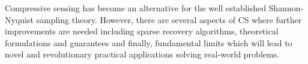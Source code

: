 \documentclass[journal]{IEEEtran}
\begin{document}
Compressive sensing has become an alternative for the well established Shannon-Nyquist sampling theory. However, there are several aspects of CS where further improvements are needed including sparse recovery algorithms, theoretical formulations and guarantees and finally, fundamental limits which will lead to novel and revolutionary practical applications solving real-world problems.





%





\end{document}
